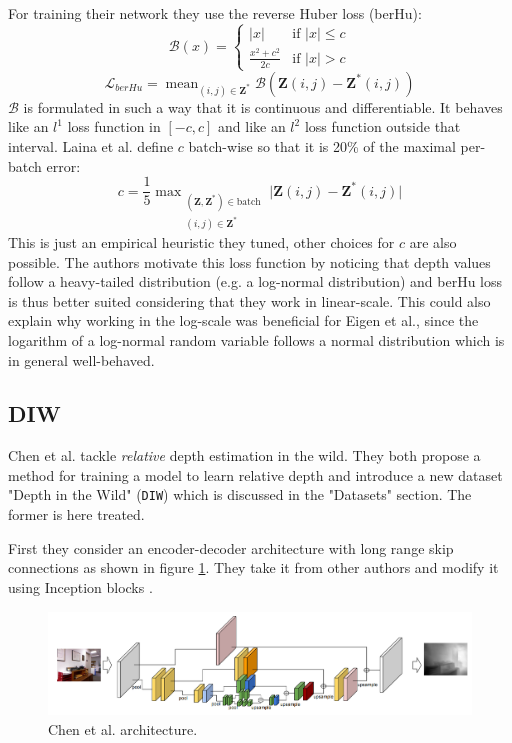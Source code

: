 For training their network they use the reverse Huber loss (berHu):
\begin{equation}
	\mathcal{B}(x) = 
	\begin{cases}
		|x| & \text{if } |x| \leq c \\
		\frac{x^{2} + c^{2}}{2c} & \text{if } |x| > c
	\end{cases}
\end{equation}
\[
	\mathcal{L}_{berHu} = \mathop{\text{mean}}_{(i, j) \in \mathbf{Z}^{*}} \mathcal{B}(\mathbf{Z}(i, j) - \mathbf{Z}^{*}(i, j))
\]
$\mathcal{B}$ is formulated in such a way that it is continuous and differentiable.
It behaves like an $l^{1}$ loss function in $[-c, c]$ and like an $l^{2}$ loss function outside that interval.
Laina et al. define $c$ batch-wise so that it is 20\% of the maximal per-batch error:
\[
	c = \frac{1}{5} \mathop{\text{max}}_{
		\substack{
			(\mathbf{Z}, \mathbf{Z}^{*}) \in \text{batch} \\
			(i, j) \in \mathbf{Z}^{*}
		}
	} \big| \mathbf{Z}(i, j) - \mathbf{Z}^{*}(i, j) \big|
\]
This is just an empirical heuristic they tuned, other choices for $c$ are also possible.
The authors motivate this loss function by noticing that depth values follow a heavy-tailed distribution (e.g. a log-normal distribution) and berHu loss is thus better suited considering that they work in linear-scale.
This could also explain \cite{Laina} why working in the log-scale was beneficial for Eigen et al., since the logarithm of a log-normal random variable follows a normal distribution which is in general well-behaved.

\subsection{DIW}
Chen et al. \cite{DIW} tackle \textit{relative} depth estimation in the wild.
They both propose a method for training a model to learn relative depth and introduce a new dataset "Depth in the Wild" (\texttt{DIW}) which is discussed in the "Datasets" section.
The former is here treated.

First they consider an encoder-decoder architecture with long range skip connections as shown in figure \ref{fig:DIW_architecture}.
They take it from other authors and modify it using Inception blocks \cite{Inception}.

\begin{figure}
\centering
\includegraphics[scale=0.4]{figs/DIW_architecture}
\caption{Chen et al. \cite{DIW} architecture. \label{fig:DIW_architecture}}
\end{figure}

